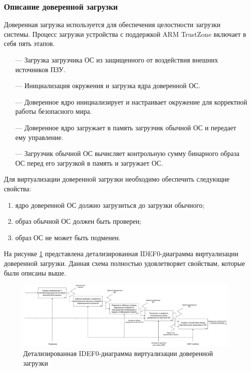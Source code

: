 \subsubsection{Описание доверенной загрузки}

Доверенная загрузка используется для обеспечения целостности загрузки системы. Процесс загрузки устройства с поддержкой ARM TrustZone включает в себя пять этапов.

\begin{itemize}
	\item [---] Загрузка загрузчика ОС из защищенного от воздействия внешних источников ПЗУ.
	\item [---] Инициализация окружения и загрузка ядра доверенной ОС.
	\item [---] Доверенное ядро инициализирует и настраивает окружение для корректной работы безопасного мира.
	\item [---] Доверенное ядро загружает в память загрузчик обычной ОС и передает ему управление.
	\item [---] Загрузчик обычной ОС вычисляет контрольную сумму бинарного образа ОС перед его загрузкой в память и загружает ОС.
\end{itemize}

Для виртуализации доверенной загрузки необходимо обеспечить следующие свойства:

\begin{enumerate}[label*=\arabic*.]
	\item ядро доверенной ОС должно загрузиться до загрузки обычного;
	\item образ обычной ОС должен быть проверен;
	\item образ ОС не может быть подменен.
\end{enumerate}

На рисунке \ref{fig:idef0-secure-boot-2} представлена детализированная IDEF0-диаграмма виртуализации доверенной загрузки. Данная схема полностью удовлетворяет свойствам, которые были описаны выше.

\begin{figure}[h!]
	\centering
	\includegraphics[width=\textwidth]{img/idef0-secure-boot-2.pdf}
	\caption{Детализированная IDEF0-диаграмма виртуализации доверенной загрузки}
	\label{fig:idef0-secure-boot-2}
\end{figure}

